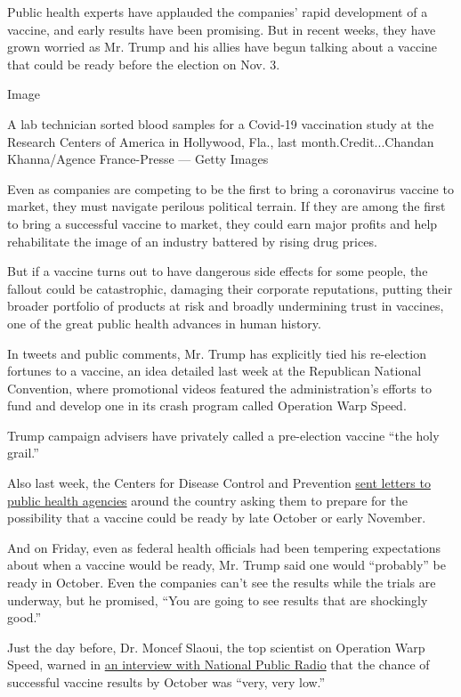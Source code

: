 Public health experts have applauded the companies' rapid development of
a vaccine, and early results have been promising. But in recent weeks,
they have grown worried as Mr. Trump and his allies have begun talking
about a vaccine that could be ready before the election on Nov. 3.

Image

A lab technician sorted blood samples for a Covid-19 vaccination study
at the Research Centers of America in Hollywood, Fla., last
month.Credit...Chandan Khanna/Agence France-Presse --- Getty Images

Even as companies are competing to be the first to bring a coronavirus
vaccine to market, they must navigate perilous political terrain. If
they are among the first to bring a successful vaccine to market, they
could earn major profits and help rehabilitate the image of an industry
battered by rising drug prices.

But if a vaccine turns out to have dangerous side effects for some
people, the fallout could be catastrophic, damaging their corporate
reputations, putting their broader portfolio of products at risk and
broadly undermining trust in vaccines, one of the great public health
advances in human history.

In tweets and public comments, Mr. Trump has explicitly tied his
re-election fortunes to a vaccine, an idea detailed last week at the
Republican National Convention, where promotional videos featured the
administration's efforts to fund and develop one in its crash program
called Operation Warp Speed.

Trump campaign advisers have privately called a pre-election vaccine
``the holy grail.''

Also last week, the Centers for Disease Control and Prevention
\href{https://www.nytimes3xbfgragh.onion/2020/09/02/health/covid-19-vaccine-cdc-plans.html}{sent
letters to public health agencies} around the country asking them to
prepare for the possibility that a vaccine could be ready by late
October or early November.

And on Friday, even as federal health officials had been tempering
expectations about when a vaccine would be ready, Mr. Trump said one
would ``probably'' be ready in October. Even the companies can't see the
results while the trials are underway, but he promised, ``You are going
to see results that are shockingly good.''

Just the day before, Dr. Moncef Slaoui, the top scientist on Operation
Warp Speed, warned in
\href{https://www.npr.org/2020/09/03/909312697/operation-warp-speed-top-adviser-on-the-status-of-a-coronavirus-vaccine}{an
interview with National Public Radio} that the chance of successful
vaccine results by October was ``very, very low.''

